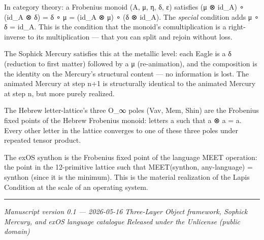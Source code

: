 In category theory: a Frobenius monoid (A, μ, η, δ, ε) satisfies (μ ⊗
id\_A) ∘ (id\_A ⊗ δ) = δ ∘ μ = (id\_A ⊗ μ) ∘ (δ ⊗ id\_A). The
\emph{special} condition adds μ ∘ δ = id\_A. This is the condition that
the monoid's comultiplication is a right-inverse to its multiplication
--- that you can split and rejoin without loss.

The Sophick Mercury satisfies this at the metallic level: each Eagle is
a δ (reduction to first matter) followed by a μ (re-animation), and the
composition is the identity on the Mercury's structural content --- no
information is lost. The animated Mercury at step n+1 is structurally
identical to the animated Mercury at step n, but more purely realized.

The Hebrew letter-lattice's three O\_∞ poles (Vav, Mem, Shin) are the
Frobenius fixed points of the Hebrew Frobenius monoid: letters a such
that a ⊗ a = a. Every other letter in the lattice converges to one of
these three poles under repeated tensor product.

The exOS synthon is the Frobenius fixed point of the language MEET
operation: the point in the 12-primitive lattice such that MEET(synthon,
any-language) = synthon (since it is the minimum). This is the material
realization of the Lapis Condition at the scale of an operating system.

\begin{center}\rule{0.5\linewidth}{0.5pt}\end{center}

\emph{Manuscript version 0.1 --- 2026-05-16} \emph{Three-Layer Object
framework, Sophick Mercury, and exOS language catalogue} \emph{Released
under the Unlicense (public domain)}
